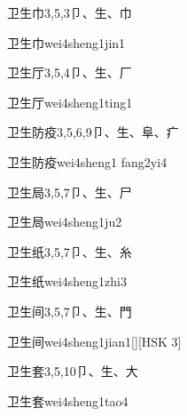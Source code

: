 \begin{entry}{卫生巾}{3,5,3}{⼙、⽣、⼱}
  \begin{phonetics}{卫生巾}{wei4sheng1jin1}
  \end{phonetics}
\end{entry}

\begin{entry}{卫生厅}{3,5,4}{⼙、⽣、⼚}
  \begin{phonetics}{卫生厅}{wei4sheng1ting1}
  \end{phonetics}
\end{entry}

\begin{entry}{卫生防疫}{3,5,6,9}{⼙、⽣、⾩、⽧}
  \begin{phonetics}{卫生防疫}{wei4sheng1 fang2yi4}
  \end{phonetics}
\end{entry}

\begin{entry}{卫生局}{3,5,7}{⼙、⽣、⼫}
  \begin{phonetics}{卫生局}{wei4sheng1ju2}
  \end{phonetics}
\end{entry}

\begin{entry}{卫生纸}{3,5,7}{⼙、⽣、⽷}
  \begin{phonetics}{卫生纸}{wei4sheng1zhi3}
  \end{phonetics}
\end{entry}

\begin{entry}{卫生间}{3,5,7}{⼙、⽣、⾨}
  \begin{phonetics}{卫生间}{wei4sheng1jian1}[][HSK 3]
  \end{phonetics}
\end{entry}

\begin{entry}{卫生套}{3,5,10}{⼙、⽣、⼤}
  \begin{phonetics}{卫生套}{wei4sheng1tao4}
  \end{phonetics}
\end{entry}

